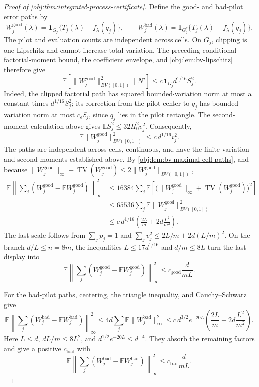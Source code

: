 \begin{proof}[Proof of \cref{obj:thm:integrated-process-certificate}]
Define the good- and bad-pilot error paths by
\[
W_j^{\mathrm{good}}(\lambda)
 =\mathbf1_{G_j}\{T_j(\lambda)-f_\lambda(q_j)\},
\qquad
W_j^{\mathrm{bad}}(\lambda)
 =\mathbf1_{G_j^c}\{T_j(\lambda)-f_\lambda(q_j)\}.
\]
The pilot and evaluation counts are independent across cells. On \(G_j\), clipping is one-Lipschitz and cannot increase total variation. The preceding conditional factorial-moment bound, the coefficient envelope, and \cref{obj:lem:bv-lipschitz} therefore give
\[
\mathbb E\!\left[\|W_j^{\mathrm{good}}\|_{BV([0,1])}^2\mid N'\right]
 \leq c\,\mathbf1_{G_j}d^{1/16}S_j^2.
\]
Indeed, the clipped factorial path has squared bounded-variation norm at most a constant times \(d^{1/16}S_j^2\); its correction from the pilot center to \(q_j\) has bounded-variation norm at most \(c_\epsilon S_j\), since \(q_j\) lies in the pilot rectangle. The second-moment calculation above gives \(\mathbb ES_j^2\leq32H_0^2v_j^2\). Consequently,
\[
\mathbb E\|W_j^{\mathrm{good}}\|_{BV([0,1])}^2
 \leq c\,d^{1/16}v_j^2.
\]
The paths are independent across cells, continuous, and have the finite variation and second moments established above. By \cref{obj:lem:bv-maximal-cell-paths}, and because \(\|W_j^{\mathrm{good}}\|_\infty+\operatorname{TV}(W_j^{\mathrm{good}})\leq2\|W_j^{\mathrm{good}}\|_{BV([0,1])}\),
\[
\begin{aligned}
\mathbb E\left\|\sum_j
 (W_j^{\mathrm{good}}-\mathbb EW_j^{\mathrm{good}})
 \right\|_\infty^2
&\leq 16384\sum_j\mathbb E
 \left[\bigl(\|W_j^{\mathrm{good}}\|_\infty+
 \operatorname{TV}(W_j^{\mathrm{good}})\bigr)^2\right]\\
&\leq65536\sum_j\mathbb E
 \|W_j^{\mathrm{good}}\|_{BV([0,1])}^2\\
&\leq c\,d^{1/16}
 \left(\frac{2L}{m}+2d\frac{L^2}{m^2}\right).
\end{aligned}
\]
The last scale follows from \(\sum_jp_j=1\) and
\(\sum_jv_j^2\leq2L/m+2d(L/m)^2\). On the branch \(d/L\leq n=8m\), the inequalities \(L\leq17d^{1/16}\) and \(d/m\leq8L\) turn the last display into
\[
\mathbb E\left\|\sum_j
 (W_j^{\mathrm{good}}-\mathbb EW_j^{\mathrm{good}})
 \right\|_\infty^2
 \leq c_{\mathrm{good}}\frac d{mL}.
\]

For the bad-pilot paths, centering, the triangle inequality, and Cauchy–Schwarz give
\[
\mathbb E\left\|\sum_j
 (W_j^{\mathrm{bad}}-\mathbb EW_j^{\mathrm{bad}})
 \right\|_\infty^2
 \leq4d\sum_j\mathbb E\|W_j^{\mathrm{bad}}\|_\infty^2
 \leq c\,d^{3/2}e^{-20L}
 \left(\frac{2L}{m}+2d\frac{L^2}{m^2}\right).
\]
Here \(L\leq d\), \(dL/m\leq8L^2\), and
\(d^{1/2}e^{-20L}\leq d^{-4}\). They absorb the remaining factors and give a positive \(c_{\mathrm{bad}}\) with
\[
\mathbb E\left\|\sum_j
 (W_j^{\mathrm{bad}}-\mathbb EW_j^{\mathrm{bad}})
 \right\|_\infty^2
 \leq c_{\mathrm{bad}}\frac d{mL}.
\]


\end{proof}
